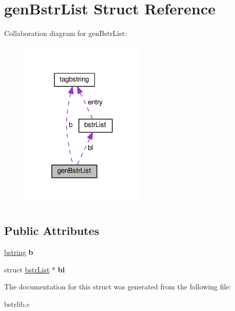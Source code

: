 \hypertarget{structgenBstrList}{}\section{gen\+Bstr\+List Struct Reference}
\label{structgenBstrList}


Collaboration diagram for gen\+Bstr\+List\+:\nopagebreak
\begin{figure}[H]
\begin{center}
\leavevmode
\includegraphics[width=169pt]{structgenBstrList__coll__graph}
\end{center}
\end{figure}
\subsection*{Public Attributes}
\begin{DoxyCompactItemize}
\item 
\hypertarget{structgenBstrList_afbc60fff27346f61f706e48aa9143cb2}{}\hyperlink{structtagbstring}{bstring} {\bfseries b}\label{structgenBstrList_afbc60fff27346f61f706e48aa9143cb2}

\item 
\hypertarget{structgenBstrList_abf9382d773a085b9015807e24ac8fbda}{}struct \hyperlink{structbstrList}{bstr\+List} $\ast$ {\bfseries bl}\label{structgenBstrList_abf9382d773a085b9015807e24ac8fbda}

\end{DoxyCompactItemize}


The documentation for this struct was generated from the following file\+:\begin{DoxyCompactItemize}
\item 
bstrlib.\+c\end{DoxyCompactItemize}
